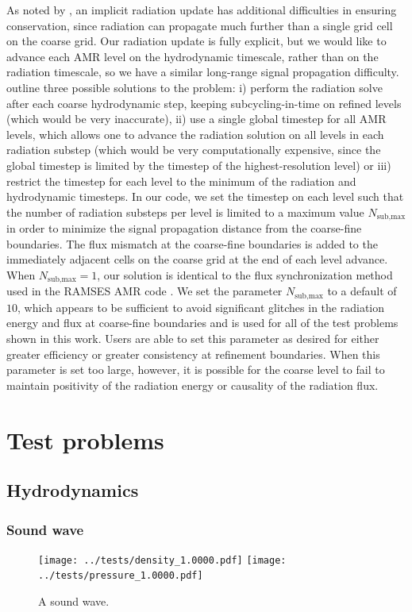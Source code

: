\documentclass[fleqn,usenatbib]{mnras}
\begin{document}
As noted by \cite{Howell_2003}, an implicit radiation update has additional difficulties in ensuring conservation, since radiation can propagate much further than a single grid cell on the coarse grid. Our radiation update is fully explicit, but we would like to advance each AMR level on the hydrodynamic timescale, rather than on the radiation timescale, so we have a similar long-range signal propagation difficulty. \cite{Rosdahl_2013} outline three possible solutions to the problem: i) perform the radiation solve after each coarse hydrodynamic step, keeping subcycling-in-time on refined levels (which would be very inaccurate), ii) use a single global timestep for all AMR levels, which allows one to advance the radiation solution on all levels in each radiation substep (which would be very computationally expensive, since the global timestep is limited by the timestep of the highest-resolution level) or iii) restrict the timestep for each level to the minimum of the radiation and hydrodynamic timesteps. In our code, we set the timestep on each level such that the number of radiation substeps per level is limited to a maximum value $N_{\text{sub,max}}$ in order to minimize the signal propagation distance from the coarse-fine boundaries. The flux mismatch at the coarse-fine boundaries is added to the immediately adjacent cells on the coarse grid at the end of each level advance. When $N_{\text{sub,max}} = 1$, our solution is identical to the flux synchronization method used in the \textsc{RAMSES} AMR code \citep{Rosdahl_2013}. We set the parameter $N_{\text{sub,max}}$ to a default of $10$, which appears to be sufficient to avoid significant glitches in the radiation energy and flux at coarse-fine boundaries and is used for all of the test problems shown in this work. Users are able to set this parameter as desired for either greater efficiency or greater consistency at refinement boundaries. When this parameter is set too large, however, it is possible for the coarse level to fail to maintain positivity of the radiation energy or causality of the radiation flux.

\section{Test problems}
\label{section:tests}

\subsection{Hydrodynamics}
\subsubsection{Sound wave}
\begin{figure}
    \texttt{[image: ../tests/density\_1.0000.pdf]}
    \texttt{[image: ../tests/pressure\_1.0000.pdf]}
    \caption{A sound wave.}
    \label{fig:sound_wave}
\end{figure}
\end{document}
